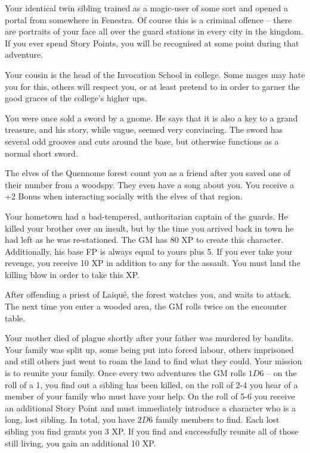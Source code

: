 \begin{list}{\addtocounter{list}{1}\textbf{:}}{\raggedleft}
	\item{ Your identical twin sibling trained as a magic-user of some sort and opened a portal from somewhere in Fenestra.  Of course this is a criminal offence -- there are portraits of your face all over the guard stations in every city in the kingdom.  If you ever spend Story Points, you will be recognised at some point during that adventure. }

	\item{ Your cousin is the head of the Invocation School in \gls{college}. Some mages may hate you for this, others will respect you, or at least pretend to in order to garner the good graces of the \gls{college}'s higher ups. }

	\item{ You were once sold a sword by a gnome.  He says that it is also a key to a grand treasure, and his story, while vague, seemed very convincing.  The sword has several odd grooves and cuts around the base, but otherwise functions as a normal short sword. }

	\item{The elves of the Quennome forest count you as a friend after you saved one of their number from a woodspy.  They even have a song about you. You receive a +2 Bonus when interacting socially with the elves of that region.}

	\item{Your hometown had a bad-tempered, authoritarian captain of the guards. He killed your brother over an insult, but by the time you arrived back in town he had left as he was re-stationed.  The GM has 80 XP to create this character.  Additionally, his base FP is always equal to yours plus 5.  If you ever take your revenge, you receive 10 XP in addition to any for the assault.  You must land the killing blow in order to take this XP.}
	\item{After offending a priest of Laiqu\"{e}, the forest watches you, and waits to attack.  The next time you enter a wooded area, the GM rolls twice on the encounter table.}

	\item{Your mother died of plague shortly after your father was murdered by bandits.  Your family was split up, some being put into forced labour, others imprisoned and still others just went to roam the land to find what they could.  Your mission is to reunite your family.  Once every two adventures the GM rolls $1D6$ -- on the roll of a 1, you find out a sibling has been killed, on the roll of 2-4 you hear of a member of your family who must have your help.  On the roll of 5-6 you receive an additional Story Point and must immediately introduce a character who is a long, lost sibling.  In total, you have $2D6$ family members to find.  Each lost sibling you find grants you 3 XP.  If you find and successfully reunite all of those still living, you gain an additional 10 XP.}


\end{list}
